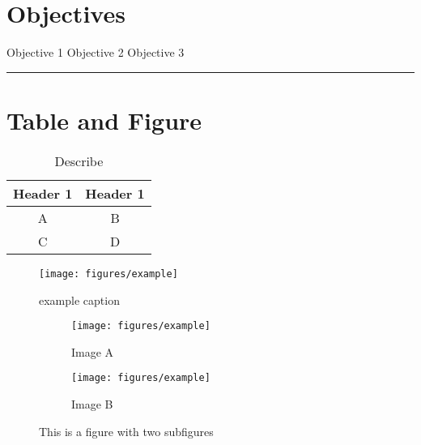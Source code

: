 
\section*{Objectives}
\begin{outline}
    \1 Objective 1
    \1 Objective 2
    \1 Objective 3
\end{outline}


\rule[0.0051in]{\textwidth}{0.00025in}






\section{Table and Figure}

\begin{table}[h!]
    \centering
    \begin{tabular}{c c}
     \toprule
    Header 1 &   Header 1 \\
      \midrule
  	A & B\\
	C & D\\
	\bottomrule
    \end{tabular}
    \caption{Describe}
    \label{tab:abc}
\end{table}
%
%
\begin{figure}[htbp] %
   \centering
   \texttt{[image: figures/example]} 
   \caption{example caption}
   \label{fig:example}
\end{figure}

\begin{figure}
	\begin{subfigure}[h]{0.4\linewidth}
		\texttt{[image: figures/example]}
		\caption{Image A}
	\end{subfigure}
		\hfill
	\begin{subfigure}[h]{0.4\linewidth}
		\texttt{[image: figures/example]}
		\caption{Image B}
	\end{subfigure}%
\caption{This is a figure with two subfigures}
\end{figure}






